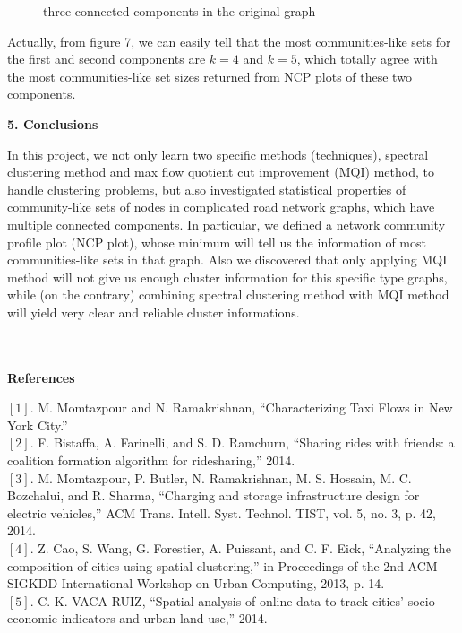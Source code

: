 \documentclass[12pt]{article}
\begin{document}
\begin{figure}[H]
\begin{subfigure}[b]{0.333\textwidth}
  \end{subfigure}
  \caption{three connected components in the original graph}
\end{figure}

Actually, from figure 7, we can easily tell that the most communities-like sets for the first and second components are $k=4$ and $k=5$, which totally agree with the most communities-like set sizes returned from NCP plots of these two components.
\begin{center}
{\Large \textbf{5. Conclusions}}
\end{center}
In this project, we not only learn two specific methods (techniques), spectral clustering method and max flow quotient cut improvement (MQI) method, to handle clustering problems, but also investigated statistical properties of community-like sets of nodes in complicated road network graphs, which have multiple connected components. In particular, we defined a network community profile plot (NCP plot), whose minimum will tell us the information of most communities-like sets in that graph. Also we discovered that only applying MQI method will not give us enough cluster information for this specific type graphs, while (on the contrary) combining spectral clustering method with MQI method will yield very clear and reliable cluster informations.\\\\\\
\begin{center}
{\Large \textbf{References}}
\end{center}
$[1]$. M. Momtazpour and N. Ramakrishnan, “Characterizing Taxi Flows in New York City.”\\
$[2]$. F. Bistaffa, A. Farinelli, and S. D. Ramchurn, “Sharing rides with friends: a coalition formation algorithm for ridesharing,” 2014.\\
$[3]$. M. Momtazpour, P. Butler, N. Ramakrishnan, M. S. Hossain, M. C. Bozchalui, and R. Sharma, “Charging and storage infrastructure design for electric vehicles,” ACM Trans. Intell. Syst. Technol. TIST, vol. 5, no. 3, p. 42, 2014.\\
$[4]$. Z. Cao, S. Wang, G. Forestier, A. Puissant, and C. F. Eick, “Analyzing the composition of cities using spatial clustering,” in Proceedings of the 2nd ACM SIGKDD International Workshop on Urban Computing, 2013, p. 14.\\
$[5]$. C. K. VACA RUIZ, “Spatial analysis of online data to track cities’ socio economic indicators and urban land use,” 2014.\\
\end{document}
